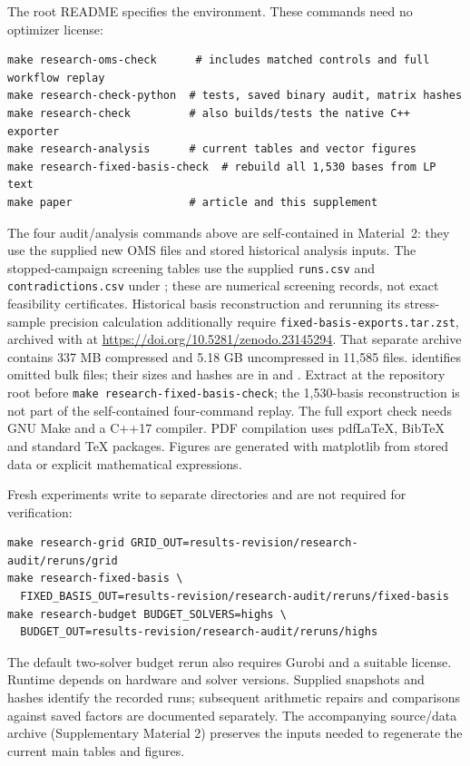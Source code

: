 \documentclass[11pt]{article}
\begin{document}
The root README specifies the environment. These commands need no optimizer license:
\begin{lstlisting}
make research-oms-check      # includes matched controls and full workflow replay
make research-check-python  # tests, saved binary audit, matrix hashes
make research-check         # also builds/tests the native C++ exporter
make research-analysis      # current tables and vector figures
make research-fixed-basis-check  # rebuild all 1,530 bases from LP text
make paper                  # article and this supplement
\end{lstlisting}
The four audit/analysis commands above are self-contained in Material~2: they use
the supplied new OMS files and stored historical analysis inputs. The stopped-campaign
screening tables use the supplied \texttt{runs.csv} and \texttt{contradictions.csv}
under ; these are numerical
screening records, not exact feasibility certificates. Historical basis
reconstruction and rerunning its stress-sample precision calculation additionally
require \texttt{fixed-basis-exports.tar.zst}, archived with
 at \url{https://doi.org/10.5281/zenodo.23145294}.
That separate archive contains 337 MB compressed and 5.18 GB uncompressed in
11,585 files.  identifies omitted bulk files; their sizes and
hashes are in  and
. Extract at the repository root
before \texttt{make research-fixed-basis-check}; the 1,530-basis reconstruction
is not part of the self-contained four-command replay.
The full export check needs GNU Make and a C++17 compiler. PDF compilation uses
pdfLaTeX, BibTeX and standard TeX packages. Figures are generated with matplotlib from stored data or explicit
mathematical expressions.

\begin{samepage}
Fresh experiments write to separate directories and are not required for verification:
\begin{lstlisting}
make research-grid GRID_OUT=results-revision/research-audit/reruns/grid
make research-fixed-basis \
  FIXED_BASIS_OUT=results-revision/research-audit/reruns/fixed-basis
make research-budget BUDGET_SOLVERS=highs \
  BUDGET_OUT=results-revision/research-audit/reruns/highs
\end{lstlisting}
\end{samepage}
The default two-solver budget rerun also requires Gurobi and a suitable license.
Runtime depends on hardware and solver versions. Supplied snapshots and hashes
identify the recorded runs; subsequent arithmetic repairs and comparisons against
saved factors are documented separately.
The accompanying source/data archive (Supplementary Material 2) preserves the inputs needed
to regenerate the current main tables and figures.
\end{document}
